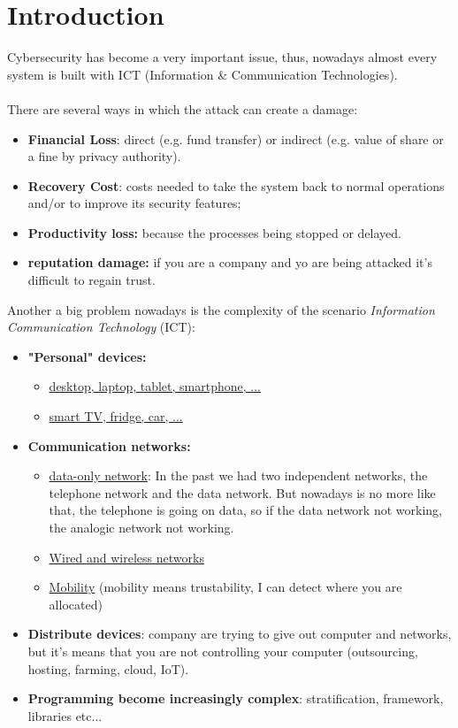 \chapter{Introduction}
Cybersecurity has become a very important issue, thus, nowadays almost every system is built
with ICT (Information \& Communication Technologies).\\
\\
There are several ways in which the attack can create a damage:
\begin{itemize}
    \item \textbf{Financial Loss}: direct (e.g. fund transfer) or indirect (e.g. value of share or a fine by privacy authority).
    \item \textbf{Recovery Cost}: costs needed to take the system back to normal operations and/or to improve its security features;
        
    \item \textbf{Productivity loss:} because the processes being stopped or delayed.
    \item \textbf{reputation damage:} if you are a company and yo are being attacked it's difficult to regain trust.
\end{itemize}
Another a big problem nowadays is the complexity of the scenario \textit{Information Communication Technology} (ICT):
\begin{itemize}
    \item  \textbf{"Personal" devices:} 
    \begin{itemize}
        \item \underline{desktop, laptop, tablet, smartphone, ...}
        \item \underline{smart TV, fridge, car, ...}
    \end{itemize}
    
    \item \textbf{Communication networks:}
    \begin{itemize}
        \item \underline{data-only network}: In the past we had two independent networks, the telephone network and the data network. But nowadays is no more like that, the  telephone is going on data, so if the data network not working, the analogic network not working.
        \item \underline{Wired and wireless networks} 
        \item \underline{Mobility} (mobility means trustability, I can detect where you are allocated)  
    \end{itemize}
    \item \textbf{Distribute devices}: company are trying to give out computer and networks, but it's means that you are not controlling your computer (outsourcing, hosting, farming, cloud, IoT).
    \item \textbf{Programming become increasingly complex}: stratification, framework, libraries etc... 
\end{itemize}
